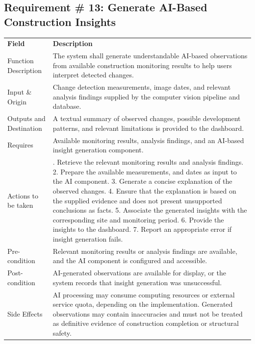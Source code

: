 \documentclass[12pt,a4paper]{report}
\begin{document}
\subsection{Requirement \# 13: Generate AI-Based Construction
Insights}\label{requirement-13-generate-ai-based-construction-insights}

\begin{longtable}[]{@{}
  >{\raggedright\arraybackslash}p{}
  >{\raggedright\arraybackslash}p{}@{}}
\toprule\noalign{}
\endhead
\bottomrule\noalign{}
\endlastfoot
\textbf{Field} & \textbf{Description} \\
Function Description & The system shall generate understandable AI-based
observations from available construction monitoring results to help
users interpret detected changes. \\
Input \& Origin & Change detection measurements, image dates, and
relevant analysis findings supplied by the computer vision pipeline and
database. \\
Outputs and Destination & A textual summary of observed changes,
possible development patterns, and relevant limitations is provided to
the dashboard. \\
Requires & Available monitoring results, analysis findings, and an
AI-based insight generation component. \\
Actions to be taken & 1. Retrieve the relevant monitoring results and
analysis findings. 2. Prepare the available measurements, and dates as
input to the AI component. 3. Generate a concise explanation of the
observed changes. 4. Ensure that the explanation is based on the
supplied evidence and does not present unsupported conclusions as facts.
5. Associate the generated insights with the corresponding site and
monitoring period. 6. Provide the insights to the dashboard. 7. Report
an appropriate error if insight generation fails. \\
Pre-condition & Relevant monitoring results or analysis findings are
available, and the AI component is configured and accessible. \\
Post-condition & AI-generated observations are available for display, or
the system records that insight generation was unsuccessful. \\
Side Effects & AI processing may consume computing resources or external
service quota, depending on the implementation. Generated observations
may contain inaccuracies and must not be treated as definitive evidence
of construction completion or structural safety. \\
\end{longtable}
\end{document}
